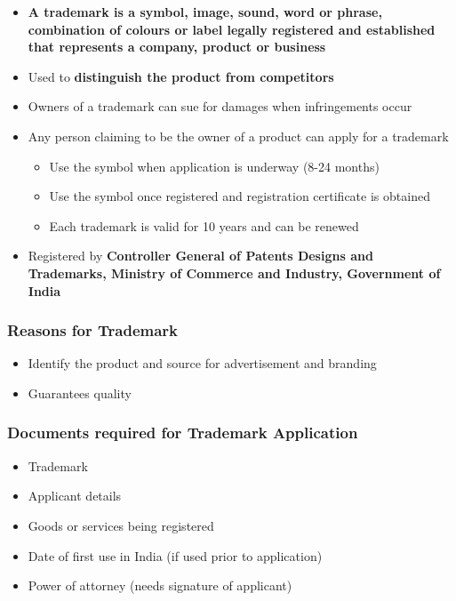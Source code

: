 \documentclass{article}
\begin{document}
\begin{itemize}
    \item \textbf{A trademark is a symbol, image, sound, word or phrase, combination of colours or label legally registered and established that represents a company, product or business}
    \item Used to \textbf{distinguish the product from competitors}
    \item Owners of a trademark can sue for damages when infringements occur
    \item Any person claiming to be the owner of a product can apply for a trademark
    \begin{itemize}
        \item Use the {\texttrademark} symbol when application is underway (8-24 months)
        \item Use the {\textregistered} symbol once registered and registration certificate is obtained
        \item Each trademark is valid for 10 years and can be renewed
    \end{itemize}
    \item Registered by \textbf{Controller General of Patents Designs and Trademarks, Ministry of Commerce and Industry, Government of India}
\end{itemize}

\subsubsection{Reasons for Trademark}

\begin{itemize}
    \item Identify the product and source for advertisement and branding
    \item Guarantees quality
\end{itemize}

\subsubsection{Documents required for Trademark Application}

\begin{itemize}
    \item Trademark
    \item Applicant details
    \item Goods or services being registered
    \item Date of first use in India (if used prior to application)
    \item Power of attorney (needs signature of applicant)
\end{itemize}
\end{document}
